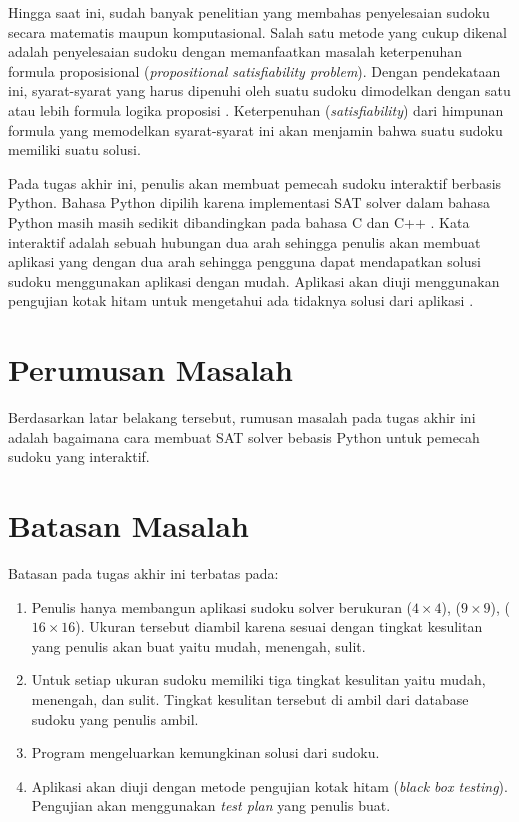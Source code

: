 Hingga saat ini, sudah banyak penelitian yang membahas penyelesaian sudoku secara
matematis maupun komputasional. Salah satu metode yang cukup dikenal adalah penyelesaian
sudoku dengan memanfaatkan masalah keterpenuhan formula proposisional (\textit{propositional satisfiability problem}). Dengan pendekataan ini, syarat-syarat yang
harus dipenuhi oleh suatu sudoku dimodelkan dengan satu atau lebih formula logika proposisi \cite{KJ06,LO06}.
Keterpenuhan (\textit{satisfiability}) dari himpunan formula yang memodelkan syarat-syarat
ini akan menjamin bahwa suatu sudoku memiliki suatu solusi.

Pada tugas akhir ini, penulis akan membuat pemecah sudoku interaktif berbasis Python. Bahasa Python dipilih
karena implementasi SAT solver dalam bahasa Python masih masih sedikit dibandingkan pada bahasa C dan C++ \cite{SATPy1}. Kata interaktif adalah sebuah hubungan dua arah \cite{inte}  sehingga penulis akan membuat aplikasi yang  dengan dua arah sehingga pengguna dapat mendapatkan solusi sudoku menggunakan aplikasi dengan mudah.  Aplikasi akan diuji menggunakan pengujian kotak hitam untuk mengetahui ada tidaknya solusi dari aplikasi \cite{TEST1}.

\section{Perumusan Masalah}

Berdasarkan latar belakang tersebut, rumusan masalah pada tugas akhir ini
adalah bagaimana cara membuat SAT solver bebasis Python untuk pemecah sudoku yang interaktif.

\section{Batasan Masalah}

Batasan pada tugas akhir ini terbatas pada:
\begin{enumerate}
	\item Penulis hanya membangun aplikasi sudoku solver berukuran ($4\times4$), ($9\times9$), ($16\times16$). Ukuran tersebut diambil karena sesuai dengan tingkat kesulitan yang penulis akan buat yaitu mudah, menengah, sulit.
	\item Untuk setiap ukuran sudoku memiliki tiga tingkat kesulitan yaitu mudah, menengah, dan sulit. Tingkat kesulitan tersebut di ambil dari database sudoku  yang penulis ambil. 
	\item Program mengeluarkan kemungkinan solusi dari sudoku.
	\item Aplikasi akan diuji dengan metode
	pengujian kotak hitam (\textit{black box testing}). Pengujian akan menggunakan \textit{test plan} yang penulis buat.
\end{enumerate}

